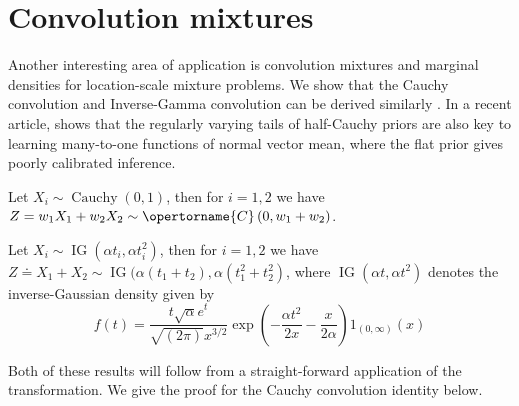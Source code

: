 \documentclass[lineno]{biometrika}
\begin{document}
\section{Convolution mixtures}

Another interesting area of application is convolution mixtures and marginal
densities for location-scale mixture problems. We show that the Cauchy
convolution \citep{pillai2015unexpected} and Inverse-Gamma convolution can be
derived similarly \citep{gelman_prior_2006, polson_halfcauchy_2012}.  In a recent 
article, \citet{bhadra_default_2016} shows that the regularly varying tails of
half-Cauchy priors are also key to learning many-to-one functions of normal
vector mean, where the flat prior gives poorly calibrated inference. 
\begin{lemma}
Let $X_i \sim \operatorname{Cauchy}(0,1)$, then for 
$i =1, 2$ we have 
$Z = w_1 X_1 + w_2 X_2 \sim \opertorname{C}\left( 0, w_1 + w_2 \right)$.
\end{lemma}

\begin{lemma}
Let $X_i \sim \operatorname{IG}(\alpha t_i, \alpha t_i^2)$, then for 
$i = 1, 2$ we have 
$Z \doteq X_1 + X_2 \sim \operatorname{IG}(\alpha (t_1 + t_2), \alpha (t_1^2+t_2^2)$, 
where $\operatorname{IG}(\alpha t, \alpha t^2)$ denotes the inverse-Gaussian 
density given by
$$
  f(t) = \frac{t \sqrt{\alpha} e^t}{\sqrt{(2 \pi)} x^{3/2}} 
  \exp\left( -\frac{\alpha t^2}{2x} - \frac{x}{2\alpha} \right) 1_{(0,\infty)}(x) 
$$
\end{lemma}

Both of these results will follow from a straight-forward application of the \CS{} 
transformation. We give the proof for the Cauchy convolution identity below.
\end{document}
